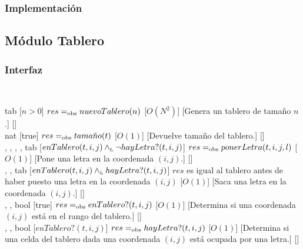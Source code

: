 \subsubsection{Implementación}

\subsection{Módulo Tablero}
\begin{interfaz}{\subsubsection{Interfaz}}
  \\
  \usa{\falta}
  \par\noindent
  \begin{operaciones}
    {
    }{tab}
    [$n>0$]
    {$res=_{\mathrm{obs}} nuevoTablero(n)$}
    [$O(N^{2})$]
    [Genera un tablero de tamaño $n$.]
    [\falta]\\

    \noindent{}
    {
    }{nat}
    [true]
    {$res=_{\mathrm{obs}} tama\tilde{n}o(t)$}
    [$O(1)$]
    [Devuelve tamaño del tablero.]
    [\falta]\\

    \noindent{}
    {
      ,
      ,
      ,
      ,
    }{tab}
    [$enTablero(t,i,j)\land_{\mathrm{\scriptscriptstyle{L}}}\lnot hayLetra?(t,i,j)$]
    {$res=_{\mathrm{obs}} ponerLetra(t,i,j,l)$}
    [$O(1)$]
    [Pone una letra en la coordenada $(i,j)$.]
    [\falta]\\

    \noindent{}
    {
      ,
      ,
    }{tab}
    [$enTablero(t,i,j)\land_{\mathrm{\scriptscriptstyle{L}}} hayLetra?(t,i,j)$]
    {$res$ es igual al tablero antes de haber puesto una letra en la coordenada $(i,j)$}
    [$O(1)$]
    [Saca una letra en la coordenada $(i,j)$.]
    [\falta]\\

    \noindent{}
    {, , }{bool}
    [true]
    {$res=_{\mathrm{obs}} enTablero?(t,i,j)$}
    [$O(1)$]
    [Determina si una coordenada $(i,j)$ está en el rango del tablero.]
    [\falta]\\

    \noindent{}
    {, , }{bool}
    [$enTablero?(t,i,j)$]
    {$res=_{\mathrm{obs}} hayLetra?(t,i,j)$}
    [$O(1)$]
    [Determina si una celda del tablero dada una coordenada $(i,j)$ está ocupada por una letra.]
    [\falta]\\


\end{operaciones}
\end{interfaz}
